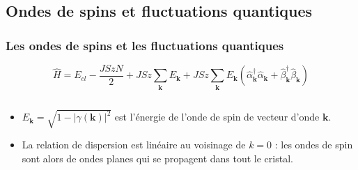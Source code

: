 \documentclass[10pt,a4paper]{beamer}
\newcommand{\h}{\ensuremath{\hat{H}}\xspace}
\newcommand{\ond}{\ensuremath{\mathbf{k}\xspace}}
\newcommand{\gam}{\gamma(\ond{})}
\newcommand{\alcre}{\hat{\alpha}^\dagger_{\ond}}
\newcommand{\alan}{\hat{\alpha}_{\ond}}
\newcommand{\betcre}{\hat{\beta}^\dagger_{\ond}}
\newcommand{\betan}{\hat{\beta}_{\ond}}
\newcommand{\1}{\ensuremath{\ket{\om_1\bom_1}}\xspace}
\newcommand{\2}{\ensuremath{\ket{\om_2\bom_2}}\xspace}
\begin{document}
\subsection{Ondes de spins et fluctuations quantiques}
\begin{frame}
\frametitle{Les ondes de spins et les fluctuations quantiques}
%

\[
	\h=E_{cl}-\frac{JSzN}{2}+JSz\sum_{\ond}E_{\ond}+JSz\sum_{\ond}E_{\ond}(\alcre\alan+\betcre\betan)
\]
\begin{columns}[t]
  \begin{column}{5cm}
\begin{itemize}
\item $E_{\ond}=\sqrt{1-|\gam|^2}$ est l'énergie de l'onde de spin de vecteur d'onde $\mathbf{k}$.
\item La relation de dispersion est linéaire au voisinage de $k=0$ : les ondes de spin sont alors de ondes planes qui se propagent dans tout le cristal.
\end{itemize}
  \end{column}
  

\end{columns}
\end{frame}
\end{document}
